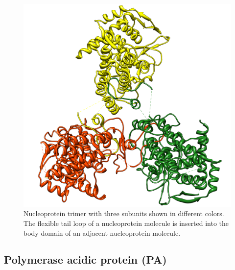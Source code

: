 \begin{figure}
\centering
\includegraphics[width=\linewidth]{../influenza/2IQH.png}
\caption{Nucleoprotein trimer with three subunits shown in different colors. The flexible tail loop of a nucleoprotein molecule is inserted into the body domain of an adjacent nucleoprotein molecule.}
\label{influenza:2IQH}
\end{figure}

\subsection{Polymerase acidic protein (PA)}


